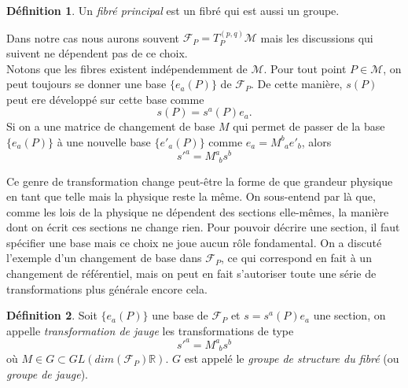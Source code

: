 \documentclass[a4paper,11pt]{report}
\theoremstyle{definition}
\theoremstyle{plain}
\theoremstyle{definition}
\newtheorem{defn}{Définition}[chapter]
\theoremstyle{remark}
\newcommand{\M}{\mathscr{M}}
\newcommand{\F}{\mathcal{F}}
\begin{document}
                \begin{defn}
                    Un \textit{fibré principal} est un fibré qui est aussi un groupe.
                \end{defn}
                
                Dans notre cas nous aurons souvent $\F_P = T_P^{(p,q)}\M$ mais les discussions qui suivent ne dépendent pas de ce choix.\\
                
                Notons que les fibres existent indépendemment de $\M$. Pour tout point $P\in\M$, on peut toujours se donner une base $\{e_a(P)\}$ de $\F_P$. De cette manière, $s(P)$ peut ere développé sur cette base comme
                \begin{equation}
                    s(P) = s^a(P)e_a.
                \end{equation}
                Si on a une matrice de changement de base $M$ qui permet de passer de la base $\{e_a(P)\}$ à une nouvelle base $\{e'_a(P)\}$ comme $e_a = M^b_{~~a} e'_b$, alors
                \begin{equation}
                    s'^a = M^a_{~~b}s^b
                \end{equation}
                
                Ce genre de transformation change peut-être la forme de que grandeur physique en tant que telle mais la physique reste la même. On sous-entend par là que, comme les lois de la physique ne dépendent des sections elle-mêmes, la manière dont on écrit ces sections ne change rien. Pour pouvoir décrire une section, il faut spécifier une base mais ce choix ne joue aucun rôle fondamental. On a discuté l'exemple d'un changement de base dans $\F_P$, ce qui correspond en fait à un changement de référentiel, mais on peut en fait s'autoriser toute une série de transformations plus générale encore cela.
                
                \begin{defn}
                    Soit $\{e_a(P)\}$ une base de $\F_P$ et $s = s^a(P)e_a$ une section, on appelle \textit{transformation de jauge} les transformations de type
                    \begin{equation}
                    s'^a = M^a_{~~b}s^b
                    \end{equation}
                    où $M\in G\subset GL(dim(\F_P)\mathbb{R})$. $G$ est appelé le \textit{groupe de structure du fibré} (ou \textit{groupe de jauge}).
                \end{defn}
                
\end{document}

